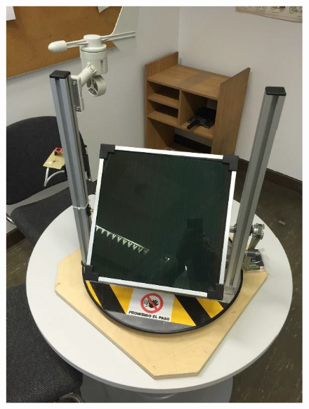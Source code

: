 \documentclass{beamer}
\begin{document}
\begin{frame}
\begin{figure}
\begin{minipage}[t]{0.45\linewidth}
      \includegraphics[width=\linewidth]{img/Wetterstation_2.png}
    \end{minipage}
  \end{figure}
\end{frame}

\begin{frame}[allowframebreaks]
  \tableofcontents %
\end{frame}
\end{document}
